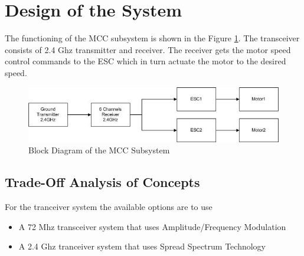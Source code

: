 \section{Design of the System}

The functioning of the MCC subsystem is shown in the Figure \ref{fig:design_block}. The transceiver consists of 2.4 Ghz transmitter and receiver. The receiver gets the motor speed control commands to the ESC which in turn actuate the motor to the desired speed.

\begin{figure}[bht]
\centering
\includegraphics[scale=0.8]{figures/blockdiagram.jpg}
\caption{Block Diagram of the MCC Subsystem}
\label{fig:design_block}
\end{figure}





\subsection{Trade-Off Analysis of Concepts}

For the tranceiver system the available options are to use
\begin{itemize}
\item A 72 Mhz transceiver system that uses Amplitude/Frequency Modulation
\item A 2.4 Ghz tranceiver system that uses Spread Spectrum Technology
\end{itemize}


